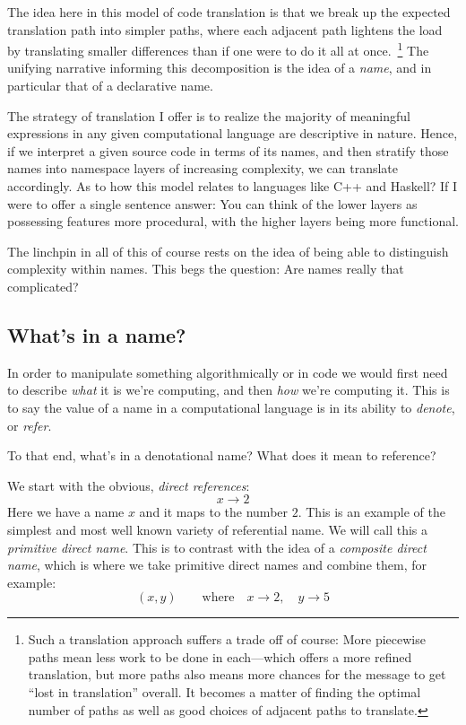 \documentclass[twoside]{article}
\begin{document}
The idea here in this model of code translation is that we break up the expected translation path into simpler
paths, where each adjacent path lightens the load by translating smaller differences than if one were to do
it all at once.~\footnote{Such a translation approach suffers a trade off of course: More piecewise paths
mean less work to be done in each---which offers a more refined translation, but more paths also means more
chances for the message to get ``lost in translation'' overall. It becomes a matter of finding the optimal
number of paths as well as good choices of adjacent paths to translate.} The unifying narrative informing
this decomposition is the idea of a \emph{name}, and in particular that of a declarative name.

The strategy of translation I offer is to realize the majority of meaningful expressions in any given computational
language are descriptive in nature. Hence, if we interpret a given source code in terms of its names, and then stratify
those names into namespace layers of increasing complexity, we can translate accordingly. As to how this model relates
to languages like C++ and Haskell? If I were to offer a single sentence answer: You can think of the lower layers
as possessing features more procedural, with the higher layers being more functional.

The linchpin in all of this of course rests on the idea of being able to distinguish complexity within names.
This begs the question: Are names really that complicated?

\subsection*{What's in a name?}

In order to manipulate something algorithmically or in code we would first need to describe \emph{what}
it is we're computing, and then \emph{how} we're computing it. This is to say the value of a name
in a computational language is in its ability to \emph{denote}, or \emph{refer}.

To that end, what's in a denotational name? What does it mean to reference?

We start with the obvious, \emph{direct references}:
$$ x\to 2 $$
Here we have a name $ x $ and it maps to the number $ 2 $. This is an example of the simplest and most well known
variety of referential name. We will call this a \emph{primitive direct name}. This is to contrast with the idea
of a \emph{composite direct name}, which is where we take primitive direct names and combine them, for example:
$$ (x, y)\qquad\mbox{where}\quad x\to 2,\quad y\to 5 $$
\end{document}
